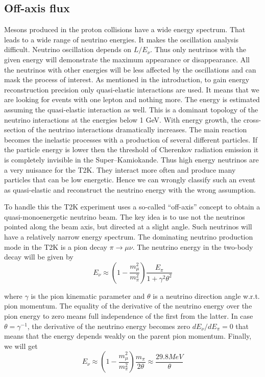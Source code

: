 \documentclass[../main.tex]{subfiles}
\begin{document}
\subsection{Off-axis flux}
\label{sec:T2K:oa_flux}
Mesons produced in the proton collisions have a wide energy spectrum. That leads to a wide range of neutrino energies. It makes the oscillation analysis difficult. Neutrino oscillation depends on $L/E_\nu$. Thus only neutrinos with the given energy will demonstrate the maximum appearance or disappearance. All the neutrinos with other energies will be less affected by the oscillations and can mask the process of interest. As mentioned in the introduction, to gain energy reconstruction precision only quasi-elastic interactions are used. It means that we are looking for events with one lepton and nothing more. The energy is estimated assuming the quasi-elastic interaction as well. This is a dominant topology of the neutrino interactions at the energies below 1 GeV. With energy growth, the cross-section of the neutrino interactions dramatically increases. The main reaction becomes the inelastic processes with a production of several different particles. If the particle energy is lower then the threshold of Cherenkov radiation emission it is completely invisible in the Super--Kamiokande. Thus high energy neutrinos are a very nuisance for the T2K. They interact more often and produce many particles that can be low energetic. Hence we can wrongly classify such an event as quasi-elastic and reconstruct the neutrino energy with the wrong assumption.

To handle this the T2K experiment uses a so-called ``off-axis'' concept to obtain a quasi-monoenergetic neutrino beam. The key idea is to use not the neutrinos pointed along the beam axis, but directed at a slight angle. Such neutrinos will have a relatively narrow energy spectrum. The dominating neutrino production mode in the T2K is a pion decay $\pi\to\mu\nu$. The neutrino energy in the two-body decay will be given by
\begin{equation}
E_\nu\approx\left(1-\frac{m_\mu^2}{m_\pi^2}\right)\frac{E_\pi}{1+\gamma^2\theta^2}
\end{equation}

where $\gamma$ is the pion kinematic parameter and $\theta$ is a neutrino direction angle w.r.t. pion momentum. The equality of the derivative of the neutrino energy over the pion energy to zero means full independence of the first from the latter. In case $\theta=\gamma^{-1}$, the derivative of the neutrino energy becomes zero $dE_\nu/dE_\pi=0$ that means that the energy depends weakly on the parent pion momentum. Finally, we will get
\begin{equation}
E_\nu\approx\left(1-\frac{m_\mu^2}{m_\pi^2}\right)\frac{m_\pi}{2\theta}\approx\frac{29.8MeV}{\theta}
\end{equation}
\end{document}
